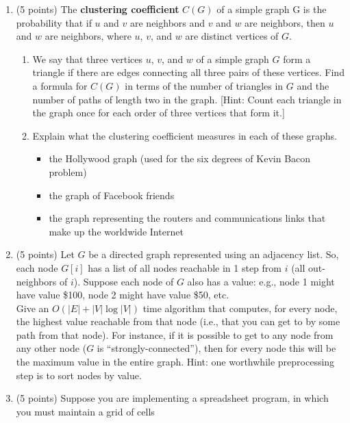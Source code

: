 \documentclass[7]{cs430homework}
\begin{document}
\maketitle

\begin{enumerate}[label=\arabic*.]
	\item (5 points) The \textbf{clustering coefficient} $C(G)$\label{def:cg} of a simple graph G is the probability that
	if $u$ and $v$ are neighbors and $v$ and $w$ are neighbors, then $u$ and $w$ are neighbors,
	where $u$, $v$, and $w$ are distinct vertices of $G$.
	\begin{enumerate}[label=\arabic{enumi}\alph*)]
		\item We say that three vertices $u$, $v$, and $w$ of a simple graph $G$ form a triangle if
		there are edges connecting all three pairs of these vertices.
		Find a formula for \hyperref[def:cg]{$C(G)$} in terms of the number of triangles in
		$G$ and the number of paths of length two in the graph.
		[Hint: Count each triangle in the graph once for each order of three vertices that form it.]
		\item Explain what the clustering coefficient measures in each of these graphs.
		\begin{itemize}
			\item the Hollywood graph (used for the six degrees of Kevin Bacon problem)
			\item the graph of Facebook friends
			\item the graph representing the routers and communications links that make up the worldwide Internet
		\end{itemize}
	\end{enumerate}
	\item (5 points) Let $G$ be a directed graph represented using an adjacency list.
	So, each node $G[i]$ has a list of all nodes reachable in 1 step from $i$ (all out-neighbors of $i$).
	Suppose each node of $G$ also has a value: e.g., node 1 might have value \$100, node 2 might have value \$50, etc.\\
	Give an $O(|E| + |V | \log |V |)$ time algorithm that computes, for every node,
	the highest value reachable from that node (i.e., that you can get to by some path from that node).
	For instance, if it is possible to get to any node from any other node ($G$ is “strongly-connected”),
	then for every node this will be the maximum value in the entire graph.
	Hint: one worthwhile preprocessing step is to sort nodes by value.
	\item (5 points) Suppose you are implementing a spreadsheet program, in which you must maintain a grid of cells

\end{enumerate}
\end{document}
